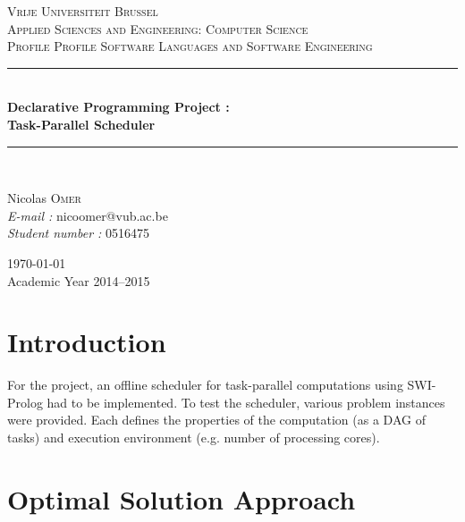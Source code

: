 \documentclass[11pt, a4paper, margin = 1.3cm]{article}
\newcommand{\HRule}{\rule{\linewidth}{0.5mm}}
\begin{document}
\begin{titlepage}
\begin{center}

\textsc{\LARGE Vrije Universiteit Brussel} \\ [1.0cm]

\textsc{Applied Sciences and Engineering: Computer Science} \\ [0.5cm]
\textsc{Profile Profile Software Languages and Software Engineering} \\ [0.5cm]

\HRule \\ [0.4cm]
{ \huge \bfseries Declarative Programming Project : \\
Task-Parallel Scheduler \\ [0.4cm] }

\HRule \\ [1.5cm]

\noindent
\begin{minipage}{0.6\textwidth}

\begin{center}

Nicolas \textsc{Omer} \\
\large \emph{E-mail : }nicoomer@vub.ac.be \\
\large \emph{Student number : }0516475 

\end{center}

\end{minipage}

\vfill

{\large \today} \\
Academic Year 2014--2015

\end{center}
\end{titlepage}

\tableofcontents

\pagebreak

\section{Introduction}

For the project, an offline scheduler for task-parallel computations using SWI-Prolog had to be implemented. To test the scheduler, various problem instances were provided. Each defines the properties of the computation (as a DAG of tasks) and execution environment (e.g. number of processing cores).

\section{Optimal Solution Approach}
\end{document}
